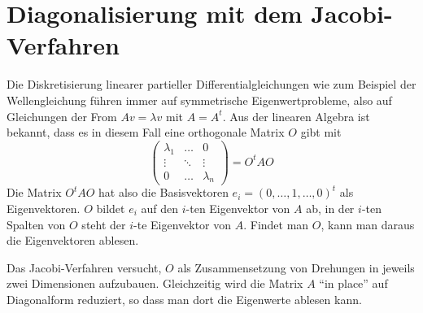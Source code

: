 %
%
%
\section{Diagonalisierung mit dem Jacobi-Verfahren
\label{buch:section:jacobi}}
Die Diskretisierung linearer partieller Differentialgleichungen wie
zum Beispiel
der Wellengleichung führen immer auf symmetrische Eigenwertprobleme,
also auf Gleichungen der From $Av=\lambda v$ mit $A=A^t$. Aus der
linearen Algebra ist bekannt, dass es in diesem Fall eine orthogonale
Matrix $O$ gibt mit
\[
\begin{pmatrix}
\lambda_1&\dots&0\\
\vdots&\ddots&\vdots\\
0&\dots&\lambda_n
\end{pmatrix}=O^tAO
\]
Die Matrix $O^tAO$ hat also die Basisvektoren $e_i=(0,\dots,1,\dots,0)^t$
als Eigenvektoren. $O$ bildet $e_i$ auf den $i$-ten Eigenvektor von $A$
ab, in der $i$-ten Spalten von $O$ steht der $i$-te Eigenvektor von $A$.
Findet man $O$, kann man daraus die Eigenvektoren ablesen.

Das Jacobi-Verfahren versucht, $O$ als Zusammensetzung von Drehungen
in jeweils zwei Dimensionen aufzubauen. Gleichzeitig wird die
Matrix $A$ ``in place'' auf Diagonalform reduziert, so dass man dort
die Eigenwerte ablesen kann.

